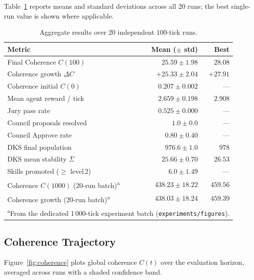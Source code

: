 \documentclass[11pt]{article}
\begin{document}
Table~\ref{tab:results} reports means and standard deviations across all 20
runs; the best single-run value is shown where applicable.

\begin{table}[H]
\centering
\caption{Aggregate results over 20 independent 100-tick runs.}
\label{tab:results}
\small
{}
\begin{tabular}{lrr}
\toprule
\textbf{Metric} & \textbf{Mean ($\pm$ std)} & \textbf{Best} \\
\midrule
Final Coherence $C(100)$               & $25.59 \pm 1.98$   & $28.08$ \\
Coherence growth $\Delta C$            & $+25.33 \pm 2.04$  & $+27.91$ \\
Coherence initial $C(0)$               & $0.207 \pm 0.002$  & --- \\
Mean agent reward / tick               & $2.659 \pm 0.198$  & $2.908$ \\
Jury pass rate                         & $0.525 \pm 0.000$  & --- \\
Council proposals resolved             & $1.0 \pm 0.0$      & --- \\
Council Approve rate                   & $0.80 \pm 0.40$    & --- \\
DKS final population                   & $976.6 \pm 1.0$    & $978$ \\
DKS mean stability $\bar{\Sigma}$      & $25.66 \pm 0.70$   & $26.53$ \\
Skills promoted ($\geq$ level\,2)      & $6.0 \pm 1.49$     & --- \\
\midrule
Coherence $C(1000)$ (20-run batch)\textsuperscript{a}  & $438.23 \pm 18.22$ & $459.56$ \\
Coherence growth (20-run batch)\textsuperscript{a}     & $438.03 \pm 18.24$ & $459.39$ \\
\bottomrule
\multicolumn{3}{l}{\textsuperscript{a}From the dedicated 1\,000-tick experiment batch
(\texttt{experiments/figures}).} \\
\end{tabular}
\end{table}

\subsection{Coherence Trajectory}

Figure~\ref{fig:coherence} plots global coherence $C(t)$ over the evaluation
horizon, averaged across runs with a shaded confidence band.
\end{document}
